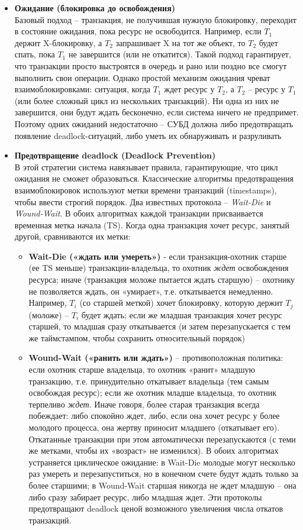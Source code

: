  \begin{itemize}
    \item \textbf{Ожидание (блокировка до освобождения)} ~\\
    Базовый подход – транзакция, не получившая нужную блокировку, переходит в состояние ожидания, пока ресурс не освободится. Например, если $T_1$ держит X-блокировку, а $T_2$ запрашивает X на тот же объект, то $T_2$ будет спать, пока $T_1$ не завершится (или не откатится). Такой подход гарантирует, что транзакции просто выстроятся в очередь и рано или поздно все смогут выполнить свои операции. Однако простой механизм ожидания чреват взаимоблокировками: ситуация, когда $T_1$ ждет ресурс у $T_2$, а $T_2$ – ресурс у $T_1$ (или более сложный цикл из нескольких транзакций). Ни одна из них не завершится, они будут ждать бесконечно, если система ничего не предпримет. Поэтому одних ожиданий недостаточно – СУБД должна либо предотвращать появление deadlock-ситуаций, либо уметь их обнаруживать и разруливать 
    \item \textbf{Предотвращение deadlock (Deadlock Prevention)} ~\\
    В этой стратегии система навязывает правила, гарантирующие, что цикл ожидания не сможет образоваться. Классические алгоритмы предотвращения взаимоблокировок используют метки времени транзакций (timestamps), чтобы ввести строгий порядок. Два известных протокола – \textit{Wait-Die} и \textit{Wound-Wait}. В обоих алгоритмах каждой транзакции присваивается временная метка начала (TS). Когда одна транзакция хочет ресурс, занятый другой, сравниваются их метки: 
    \begin{itemize}
        \item \textbf{Wait-Die («ждать или умереть»)} - если транзакция-охотник старше (ее TS меньше) транзакции-владельца, то охотник \textit{ждет} освобождения ресурса; иначе (транзакция моложе пытается ждать старшую) – охотнику не позволяется ждать, он «умирает», т.е. откатывается немедленно. Например, $T_i$ (со старшей меткой) хочет блокировку, которую держит $T_j$ (моложе) – $T_i$ будет ждать; если же младшая транзакция хочет ресурс старшей, то младшая сразу откатывается (и затем перезапускается с тем же таймстампом, чтобы сохранить относительный порядок)
        \item \textbf{Wound-Wait («ранить или ждать»)} – противоположная политика: если охотник старше владельца, то охотник «ранит» младшую транзакцию, т.е. принудительно откатывает владельца (тем самым освобождая ресурс); если же охотник младше владельца, то охотник терпеливо \textit{ждет}. Иначе говоря, более старая транзакция всегда побеждает: либо спокойно ждет, либо, если она хочет ресурс у более молодого процесса, она жертву приносит младшего (откатывает его). Откатанные транзакции при этом автоматически перезапускаются (с теми же метками, чтобы их «возраст» не изменился). В обоих алгоритмах устраняется циклическое ожидание: в Wait-Die молодые могут несколько раз умереть и перезапуститься, но в конечном счете будут ждать только за более старшими; в Wound-Wait старшая никогда не ждет младшую – она либо сразу забирает ресурс, либо младшая ждет. Эти протоколы предотвращают deadlock ценой возможного увеличения числа откатов транзакций. 

\end{itemize}
\end{itemize}
